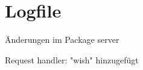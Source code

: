 \chapter{Logfile }
\hypertarget{md_src_2server_2Logfile}{}\label{md_src_2server_2Logfile}
Änderungen im Package server

Request handler\+: "{}wish"{} hinzugefügt 